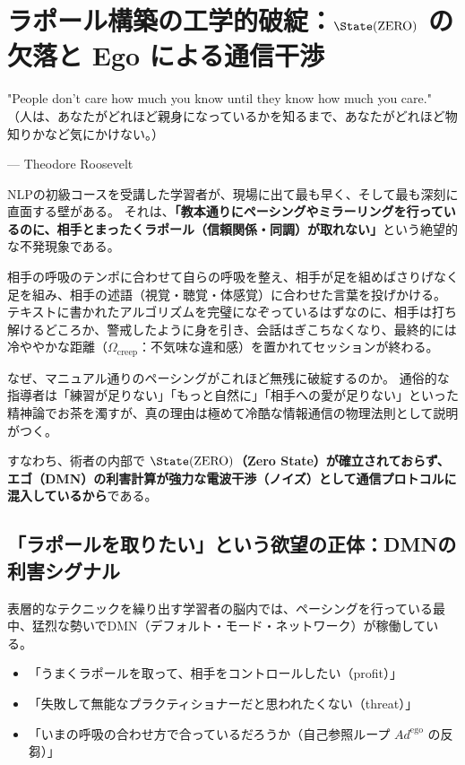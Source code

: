 \section{ラポール構築の工学的破綻：$\State(\mathrm{ZERO})$ の欠落と Ego による通信干渉}
\epigraph{"People don't care how much you know until they know how much you care."\\
\small（人は、あなたがどれほど親身になっているかを知るまで、あなたがどれほど物知りかなど気にかけない。）}{--- Theodore Roosevelt}

NLPの初級コースを受講した学習者が、現場に出て最も早く、そして最も深刻に直面する壁がある。
それは、\textbf{「教本通りにペーシングやミラーリングを行っているのに、相手とまったくラポール（信頼関係・同調）が取れない」}という絶望的な不発現象である。

相手の呼吸のテンポに合わせて自らの呼吸を整え、相手が足を組めばさりげなく足を組み、相手の述語（視覚・聴覚・体感覚）に合わせた言葉を投げかける。
テキストに書かれたアルゴリズムを完璧になぞっているはずなのに、相手は打ち解けるどころか、警戒したように身を引き、会話はぎこちなくなり、最終的には冷ややかな距離（$\Omega_{\mathrm{creep}}$：不気味な違和感）を置かれてセッションが終わる。

なぜ、マニュアル通りのペーシングがこれほど無残に破綻するのか。
通俗的な指導者は「練習が足りない」「もっと自然に」「相手への愛が足りない」といった精神論でお茶を濁すが、真の理由は極めて冷酷な情報通信の物理法則として説明がつく。

すなわち、術者の内部で \textbf{$\State(\mathrm{ZERO})$（Zero State）が確立されておらず、エゴ（DMN）の利害計算が強力な電波干渉（ノイズ）として通信プロトコルに混入しているから}である。

\subsection{「ラポールを取りたい」という欲望の正体：DMNの利害シグナル}
表層的なテクニックを繰り出す学習者の脳内では、ペーシングを行っている最中、猛烈な勢いでDMN（デフォルト・モード・ネットワーク）が稼働している。

\begin{itemize}
    \item 「うまくラポールを取って、相手をコントロールしたい（profit）」
    \item 「失敗して無能なプラクティショナーだと思われたくない（threat）」
    \item 「いまの呼吸の合わせ方で合っているだろうか（自己参照ループ $Ad^{\mathrm{ego}}$ の反芻）」
\end{itemize}

